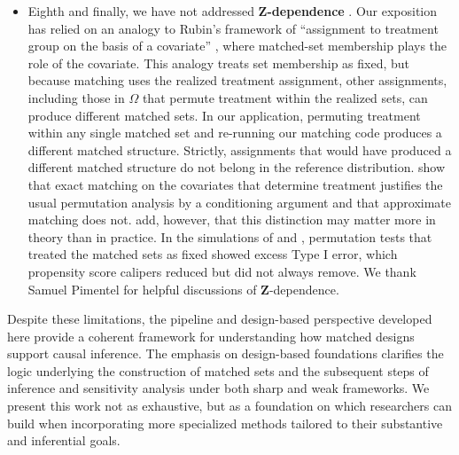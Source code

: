\documentclass[
  12pt,
  leqno]{article}
\begin{document}
\begin{itemize}
  support tests for hidden bias that inform sensitivity analyses by
  ruling out certain violations of as-if randomization
  \citep{rosenbaum2023a}.
\item
  Eighth and finally, we have not addressed
  \textbf{\(\bm{Z}\)-dependence}
  \citep{pashleyetal2021, pimentelhuang2024, pimentelyu2024}. Our
  exposition has relied on an analogy to Rubin's framework of
  ``assignment to treatment group on the basis of a covariate''
  \citep{rubin1977}, where matched-set membership plays the role of the
  covariate. This analogy treats set membership as fixed, but because
  matching uses the realized treatment assignment, other assignments,
  including those in \(\Omega\) that permute treatment within the
  realized sets, can produce different matched sets. In our application,
  permuting treatment within any single matched set and re-running our
  matching code produces a different matched structure. Strictly,
  assignments that would have produced a different matched structure do
  not belong in the reference distribution. \citet[Section
  5]{pashleyetal2021} show that exact matching on the covariates that
  determine treatment justifies the usual permutation analysis by a
  conditioning argument and that approximate matching does not.
  \citet[p.~276]{pashleyetal2021} add, however, that this distinction
  may matter more in theory than in practice. In the simulations of
  \citet{pimentelhuang2024} and \citet{pimentelyu2024}, permutation
  tests that treated the matched sets as fixed showed excess Type I
  error, which propensity score calipers reduced but did not always
  remove. We thank Samuel Pimentel for helpful discussions of
  \(\bm{Z}\)-dependence.
\end{itemize}

Despite these limitations, the pipeline and design-based perspective
developed here provide a coherent framework for understanding how
matched designs support causal inference. The emphasis on design-based
foundations clarifies the logic underlying the construction of matched
sets and the subsequent steps of inference and sensitivity analysis
under both sharp and weak frameworks. We present this work not as
exhaustive, but as a foundation on which researchers can build when
incorporating more specialized methods tailored to their substantive and
inferential goals.

\newpage


\end{document}
